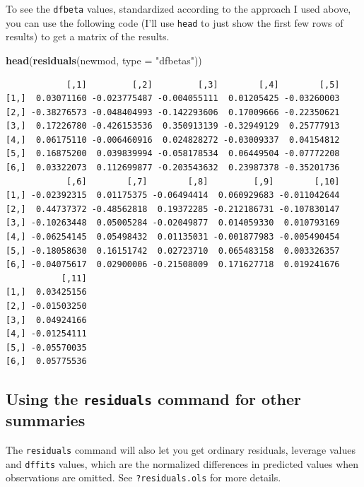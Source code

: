 \documentclass[]{book}
\newenvironment{Shaded}{\begin{snugshade}}{\end{snugshade}}
\newcommand{\KeywordTok}[1]{\textcolor[rgb]{0.13,0.29,0.53}{\textbf{#1}}}
\newcommand{\DataTypeTok}[1]{\textcolor[rgb]{0.13,0.29,0.53}{#1}}
\newcommand{\StringTok}[1]{\textcolor[rgb]{0.31,0.60,0.02}{#1}}
\newcommand{\NormalTok}[1]{#1}
\theoremstyle{definition}
\theoremstyle{definition}
\theoremstyle{definition}
\theoremstyle{remark}
\begin{document}
To see the \texttt{dfbeta} values, standardized according to the
approach I used above, you can use the following code (I'll use
\texttt{head} to just show the first few rows of results) to get a
matrix of the results.

\begin{Shaded}
\begin{Highlighting}[]
\KeywordTok{head}\NormalTok{(}\KeywordTok{residuals}\NormalTok{(newmod, }\DataTypeTok{type =} \StringTok{"dfbetas"}\NormalTok{))}
\end{Highlighting}
\end{Shaded}

\begin{verbatim}
            [,1]         [,2]         [,3]        [,4]        [,5]
[1,]  0.03071160 -0.023775487 -0.004055111  0.01205425 -0.03260003
[2,] -0.38276573 -0.048404993 -0.142293606  0.17009666 -0.22350621
[3,]  0.17226780 -0.426153536  0.350913139 -0.32949129  0.25777913
[4,]  0.06175110 -0.006460916  0.024828272 -0.03009337  0.04154812
[5,]  0.16875200  0.039839994 -0.058178534  0.06449504 -0.07772208
[6,]  0.03322073  0.112699877 -0.203543632  0.23987378 -0.35201736
            [,6]        [,7]        [,8]         [,9]        [,10]
[1,] -0.02392315  0.01175375 -0.06494414  0.060929683 -0.011042644
[2,]  0.44737372 -0.48562818  0.19372285 -0.212186731 -0.107830147
[3,] -0.10263448  0.05005284 -0.02049877  0.014059330  0.010793169
[4,] -0.06254145  0.05498432  0.01135031 -0.001877983 -0.005490454
[5,] -0.18058630  0.16151742  0.02723710  0.065483158  0.003326357
[6,] -0.04075617  0.02900006 -0.21508009  0.171627718  0.019241676
           [,11]
[1,]  0.03425156
[2,] -0.01503250
[3,]  0.04924166
[4,] -0.01254111
[5,] -0.05570035
[6,]  0.05775536
\end{verbatim}

\subsection{\texorpdfstring{Using the \texttt{residuals} command for
other
summaries}{Using the residuals command for other summaries}}\label{using-the-residuals-command-for-other-summaries}

The \texttt{residuals} command will also let you get ordinary residuals,
leverage values and \texttt{dffits} values, which are the normalized
differences in predicted values when observations are omitted. See
\texttt{?residuals.ols} for more details.
\end{document}
